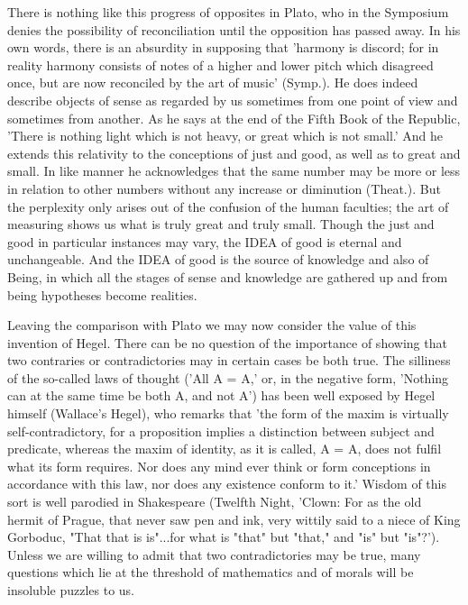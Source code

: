 \documentclass[11pt,letter]{article}
\begin{document}
\par  There is nothing like this progress of opposites in Plato, who in the Symposium denies the possibility of reconciliation until the opposition has passed away. In his own words, there is an absurdity in supposing that 'harmony is discord; for in reality harmony consists of notes of a higher and lower pitch which disagreed once, but are now reconciled by the art of music' (Symp.). He does indeed describe objects of sense as regarded by us sometimes from one point of view and sometimes from another. As he says at the end of the Fifth Book of the Republic, 'There is nothing light which is not heavy, or great which is not small.' And he extends this relativity to the conceptions of just and good, as well as to great and small. In like manner he acknowledges that the same number may be more or less in relation to other numbers without any increase or diminution (Theat.). But the perplexity only arises out of the confusion of the human faculties; the art of measuring shows us what is truly great and truly small. Though the just and good in particular instances may vary, the IDEA of good is eternal and unchangeable. And the IDEA of good is the source of knowledge and also of Being, in which all the stages of sense and knowledge are gathered up and from being hypotheses become realities.

\par  Leaving the comparison with Plato we may now consider the value of this invention of Hegel. There can be no question of the importance of showing that two contraries or contradictories may in certain cases be both true. The silliness of the so-called laws of thought ('All A = A,' or, in the negative form, 'Nothing can at the same time be both A, and not A') has been well exposed by Hegel himself (Wallace's Hegel), who remarks that 'the form of the maxim is virtually self-contradictory, for a proposition implies a distinction between subject and predicate, whereas the maxim of identity, as it is called, A = A, does not fulfil what its form requires. Nor does any mind ever think or form conceptions in accordance with this law, nor does any existence conform to it.' Wisdom of this sort is well parodied in Shakespeare (Twelfth Night, 'Clown: For as the old hermit of Prague, that never saw pen and ink, very wittily said to a niece of King Gorboduc, "That that is is"...for what is "that" but "that," and "is" but "is"?'). Unless we are willing to admit that two contradictories may be true, many questions which lie at the threshold of mathematics and of morals will be insoluble puzzles to us.
\end{document}
